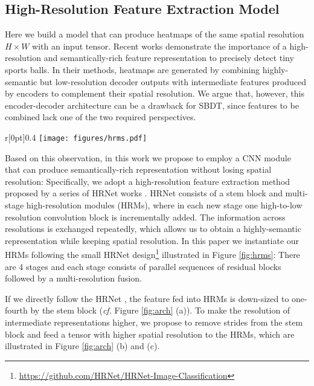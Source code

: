 \documentclass{bmvc2k}
\begin{document}
\subsection{High-Resolution Feature Extraction Model}
\label{sec:method:cnn}
Here we build a model that can produce heatmaps of the same spatial resolution $H \times W$ with an input tensor.
Recent works \cite{komorowski+2019mva,komorowski+2019visapp,zandycke+2019mmsports,sun+2020icpai,huang+2019avss,liu+2022cvprw} demonstrate the importance of a high-resolution and semantically-rich feature representation to precisely detect tiny sports balls.
In their methods, heatmaps are generated by combining highly-semantic but low-resolution decoder outputs with intermediate features produced by encoders to complement their spatial resolution.
We argue that, however, this encoder-decoder architecture can be a drawback for SBDT, since features to be combined lack one of the two required perspectives.
\par
\begin{wrapfigure}{r}[0pt]{0.4\textwidth}
\vspace*{-5mm}
\centering
\texttt{[image: figures/hrms.pdf]}
\caption{High-Resolution Modules (HRMs) of our SBDT method.}
\label{fig:hrms}
\end{wrapfigure}
Based on this observation, in this work we propose to employ a CNN module that can produce semantically-rich representation without losing spatial resolution:
Specifically, we adopt a high-resolution feature extraction method proposed by a series of HRNet works \cite{wang+2021tpami,yu+2021cvpr}.
HRNet consists of a stem block and multi-stage high-resolution modules (HRMs), where in each new stage one high-to-low resolution convolution block is incrementally added.
The information across resolutions is exchanged repeatedly, which allows us to obtain a highly-semantic representation while keeping spatial resolution.
In this paper we instantiate our HRMs following the small HRNet design\footnote{\url{https://github.com/HRNet/HRNet-Image-Classification}} illustrated in Figure \ref{fig:hrms}:
There are 4 stages and each stage consists of parallel sequences of residual blocks \cite{he+2016cvpr} followed by a multi-resolution fusion.
\par
If we directly follow the HRNet \cite{wang+2021tpami,yu+2021cvpr}, the feature fed into HRMs is down-sized to one-fourth by the stem block ({\it cf.} Figure \ref{fig:arch} (a)).
To make the resolution of intermediate representations higher, we propose to remove strides from the stem block and feed a tensor with higher spatial resolution to the HRMs, which are illustrated in Figure \ref{fig:arch} (b) and (c).
\end{document}
